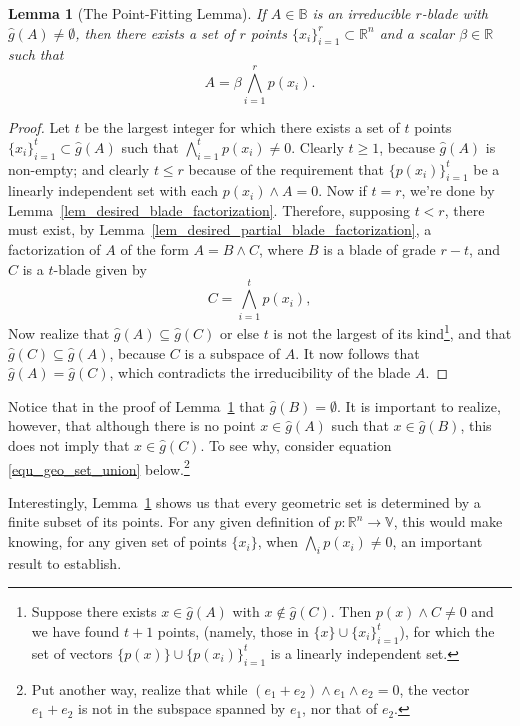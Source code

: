 \documentclass{birkjour}
\newtheorem{lem}[thm]{Lemma}
\theoremstyle{definition}
\theoremstyle{remark}
\numberwithin{equation}{section}
\newcommand{\R}{\mathbb{R}}
\newcommand{\B}{\mathbb{B}}
\newcommand{\V}{\mathbb{V}}
\newcommand{\gh}{\hat{g}}
\begin{document}
\begin{lem}[The Point-Fitting Lemma]\label{lem_factorization_of_irreducible_blades}
If $A\in\B$ is an irreducible $r$-blade with $\gh(A)\neq\emptyset$, then there exists a set of $r$ points $\{x_i\}_{i=1}^r\subset\R^n$
and a scalar $\beta\in\R$ such that
\begin{equation}
A=\beta\bigwedge_{i=1}^r p(x_i).
\end{equation}
\end{lem}
\begin{proof}
Let $t$ be the largest integer for which there exists a set of $t$ points $\{x_i\}_{i=1}^t\subset\gh(A)$ such that
$\bigwedge_{i=1}^t p(x_i)\neq 0$.
Clearly $t\geq 1$, because $\gh(A)$ is non-empty; and clearly $t\leq r$ because of
the requirement that $\{p(x_i)\}_{i=1}^t$ be a linearly independent set with each $p(x_i)\wedge A=0$.  Now if $t=r$, we're
done by Lemma~\ref{lem_desired_blade_factorization}.  Therefore,
supposing $t<r$, there must exist, by Lemma~\ref{lem_desired_partial_blade_factorization}, a factorization of $A$ of the form
$A=B\wedge C$, where $B$ is a blade of grade $r-t$, and $C$ is a $t$-blade given by
\begin{equation}
C=\bigwedge_{i=1}^t p(x_i),
\end{equation}
Now realize that $\gh(A)\subseteq\gh(C)$ or else $t$ is not the largest of its kind\footnote{Suppose
there exists $x\in\gh(A)$ with $x\not\in\gh(C)$.  Then $p(x)\wedge C\neq 0$ and we have found $t+1$
points, (namely, those in $\{x\}\cup\{x_i\}_{i=1}^t$), for which the set of vectors $\{p(x)\}\cup\{p(x_i)\}_{i=1}^t$ is a linearly independent set.}, and
that $\gh(C)\subseteq\gh(A)$, because $C$ is a subspace of $A$.
It now follows that $\gh(A)=\gh(C)$, which contradicts the irreducibility of the blade $A$.
\end{proof}

Notice that in the proof of Lemma~\ref{lem_factorization_of_irreducible_blades} that $\gh(B)=\emptyset$.  It is important to realize, however,
that although there is no point $x\in\gh(A)$ such that $x\in\gh(B)$, this does not imply that $x\in\gh(C)$.
To see why, consider equation \eqref{equ_geo_set_union} below.\footnote{Put another way,
realize that while $(e_1+e_2)\wedge e_1\wedge e_2=0$, the vector $e_1+e_2$ is not in the subspace
spanned by $e_1$, nor that of $e_2$.}

Interestingly, Lemma~\ref{lem_factorization_of_irreducible_blades} shows us that every geometric
set is determined by a finite subset of its points.  For any given definition of $p:\R^n\to\V$, this
would make knowing, for any given set of points $\{x_i\}$, when $\bigwedge_i p(x_i)\neq 0$,
an important result to establish.
\end{document}
